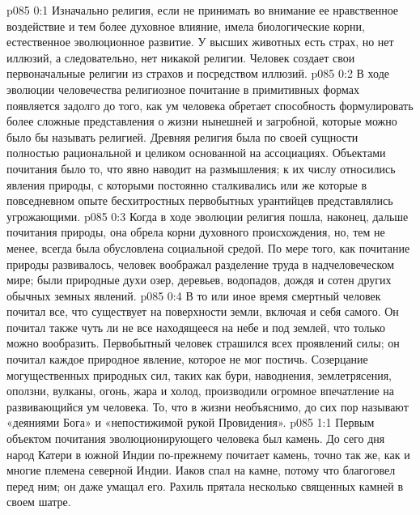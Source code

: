\author{Блестящая Вечерняя Звезда}
\vs p085 0:1 Изначально религия, если не принимать во внимание ее нравственное воздействие и тем более духовное влияние, имела биологические корни, естественное эволюционное развитие. У высших животных есть страх, но нет иллюзий, а следовательно, нет никакой религии. Человек создает свои первоначальные религии из страхов и посредством иллюзий.
\vs p085 0:2 В ходе эволюции человечества религиозное почитание в примитивных формах появляется задолго до того, как ум человека обретает способность формулировать более сложные представления о жизни нынешней и загробной, которые можно было бы называть религией. Древняя религия была по своей сущности полностью рациональной и целиком основанной на ассоциациях. Объектами почитания было то, что явно наводит на размышления; к их числу относились явления природы, с которыми постоянно сталкивались или же которые в повседневном опыте бесхитростных первобытных урантийцев представлялись угрожающими.
\vs p085 0:3 Когда в ходе эволюции религия пошла, наконец, дальше почитания природы, она обрела корни духовного происхождения, но, тем не менее, всегда была обусловлена социальной средой. По мере того, как почитание природы развивалось, человек воображал разделение труда в надчеловеческом мире; были природные духи озер, деревьев, водопадов, дождя и сотен других обычных земных явлений.
\vs p085 0:4 В то или иное время смертный человек почитал все, что существует на поверхности земли, включая и себя самого. Он почитал также чуть ли не все находящееся на небе и под землей, что только можно вообразить. Первобытный человек страшился всех проявлений силы; он почитал каждое природное явление, которое не мог постичь. Созерцание могущественных природных сил, таких как бури, наводнения, землетрясения, оползни, вулканы, огонь, жара и холод, производили огромное впечатление на развивающийся ум человека. То, что в жизни необъяснимо, до сих пор называют «деяниями Бога» и «непостижимой рукой Провидения».
\vs p085 1:1 Первым объектом почитания эволюционирующего человека был камень. До сего дня народ Катери в южной Индии по\hyp{}прежнему почитает камень, точно так же, как и многие племена северной Индии. Иаков спал на камне, потому что благоговел перед ним; он даже умащал его. Рахиль прятала несколько священных камней в своем шатре.
